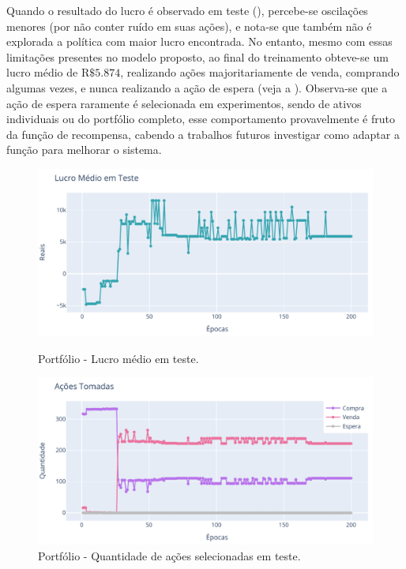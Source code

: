 
Quando o resultado do lucro é observado em teste (), percebe-se oscilações menores (por não conter ruído em suas ações), e nota-se que também não é explorada a política com maior lucro encontrada. No entanto, mesmo com essas limitações presentes no modelo proposto, ao final do treinamento obteve-se um lucro médio de R$\$5.874$, realizando ações majoritariamente de venda, comprando algumas vezes, e nunca realizando a ação de espera (veja a ). Observa-se que a ação de espera raramente é selecionada em experimentos, sendo de ativos individuais ou do portfólio completo, esse comportamento provavelmente é fruto da função de recompensa, cabendo a trabalhos futuros investigar como adaptar a função para melhorar o sistema.

\begin{figure}[htbp]
    \centering 
    \begin{minipage}[b]{0.45\linewidth}
        \includegraphics[width=\linewidth]{img/ddpg/all/clean/profit}
        \caption{Portfólio - Lucro médio em teste.} 
        \label{all_clean_profit}
    \end{minipage}
    \quad
    \begin{minipage}[b]{0.45\linewidth}
        \includegraphics[width=\linewidth]{img/ddpg/all/clean/actions}
        \caption{Portfólio - Quantidade de ações selecionadas em teste.}
        \label{all_clean_act}
    \end{minipage}
\end{figure}

